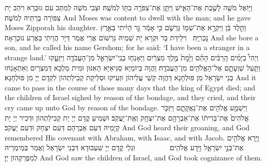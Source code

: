 {וַיּ֥וֹאֶל מֹשֶׁ֖ה לָשֶׁ֣בֶת אֶת־הָאִ֑ישׁ וַיִּתֵּ֛ן אֶת־צִפֹּרָ֥ה בִתּ֖וֹ לְמֹשֶֽׁה׃
}
{וּצְבִי מֹשֶׁה לְמִתַּב עִם גּוּבְרָא וִיהַב יָת צִפּוֹרָה בְּרַתֵּיהּ לְמֹשֶׁה׃}
{And Moses was content to dwell with the man; and he gave Moses Zipporah his daughter.}{}
{וַתֵּ֣לֶד בֵּ֔ן וַיִּקְרָ֥א אֶת־שְׁמ֖וֹ גֵּרְשֹׁ֑ם כִּ֣י אָמַ֔ר גֵּ֣ר הָיִ֔יתִי בְּאֶ֖רֶץ נׇכְרִיָּֽה׃ \petucha }
{וִילֵידַת בַּר וּקְרָא יָת שְׁמֵיהּ גֵּרְשׁוֹם אֲרֵי אֲמַר דַּיָּר הֲוֵיתִי בַּאֲרַע נוּכְרָאָה׃}
{And she bore a son, and he called his name Gershom; for he said: ‘I have been a stranger in a strange land.’}{}
{וַיְהִי֩ בַיָּמִ֨ים הָֽרַבִּ֜ים הָהֵ֗ם וַיָּ֙מׇת֙ מֶ֣לֶךְ מִצְרַ֔יִם וַיֵּאָנְח֧וּ בְנֵֽי־יִשְׂרָאֵ֛ל מִן־הָעֲבֹדָ֖ה וַיִּזְעָ֑קוּ וַתַּ֧עַל שַׁוְעָתָ֛ם אֶל־הָאֱלֹהִ֖ים מִן־הָעֲבֹדָֽה׃
}
{וַהֲוָה בְּיוֹמַיָּא סַגִּיאַיָּא הָאִנּוּן וּמִית מַלְכָּא דְּמִצְרַיִם וְאִתְאָנַחוּ בְּנֵי יִשְׂרָאֵל מִן פּוּלְחָנָא דַּהֲוָה קְשֵׁי עֲלֵיהוֹן וּזְעִיקוּ וּסְלֵיקַת קְבִילַתְהוֹן לִקְדָם יְיָ מִן פּוּלְחָנָא׃}
{And it came to pass in the course of those many days that the king of Egypt died; and the children of Israel sighed by reason of the bondage, and they cried, and their cry came up unto God by reason of the bondage.}{}
{וַיִּשְׁמַ֥ע אֱלֹהִ֖ים אֶת־נַאֲקָתָ֑ם וַיִּזְכֹּ֤ר אֱלֹהִים֙ אֶת־בְּרִית֔וֹ אֶת־אַבְרָהָ֖ם אֶת־יִצְחָ֥ק וְאֶֽת־יַעֲקֹֽב׃
}
{וּשְׁמִיעַ קֳדָם יְיָ יָת קְבִילַתְהוֹן וּדְכִיר יְיָ יָת קְיָמֵיהּ דְּעִם אַבְרָהָם דְּעִם יִצְחָק וּדְעִם יַעֲקֹב׃}
{And God heard their groaning, and God remembered His covenant with Abraham, with Isaac, and with Jacob.}{}
{וַיַּ֥רְא אֱלֹהִ֖ים אֶת־בְּנֵ֣י יִשְׂרָאֵ֑ל וַיֵּ֖דַע אֱלֹהִֽים׃ \setuma         
}
{וּגְלֵי קֳדָם יְיָ שִׁעְבּוּדָא דִּבְנֵי יִשְׂרָאֵל וַאֲמַר בְּמֵימְרֵיהּ לְמִפְרַקְהוֹן יְיָ׃}
{And God saw the children of Israel, and God took cognizance of them.}{}
